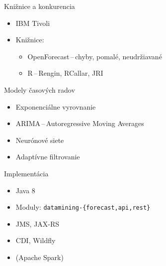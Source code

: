 \documentclass{beamer}
\begin{document}
\begin{frame}{Knižnice a konkurencia}
  \begin{itemize}
    \item IBM Tivoli
    \item Knižnice:
        \begin{itemize}
            \item OpenForecast\,--\,chyby, pomalé, neudržiavané
            \item R\,--\,Rengin, RCallar, JRI
        \end{itemize}
  \end{itemize}
\end{frame}

\begin{frame}{Modely časových radov}
  \begin{itemize}
    \item Exponenciálne vyrovnanie
    \item ARIMA\,--\,Autoregressive Moving Averages
    \item Neurónové siete
    \item Adaptívne filtrovanie
  \end{itemize}
\end{frame}

\begin{frame}{Implementácia}
  \begin{itemize}
    \item Java 8
    \item Moduly: \texttt{datamining-\{forecast,api,rest\}}
    \item JMS, JAX-RS
    \item CDI, Wildfly
    \item (Apache Spark)
  \end{itemize}
\end{frame}
\end{document}
